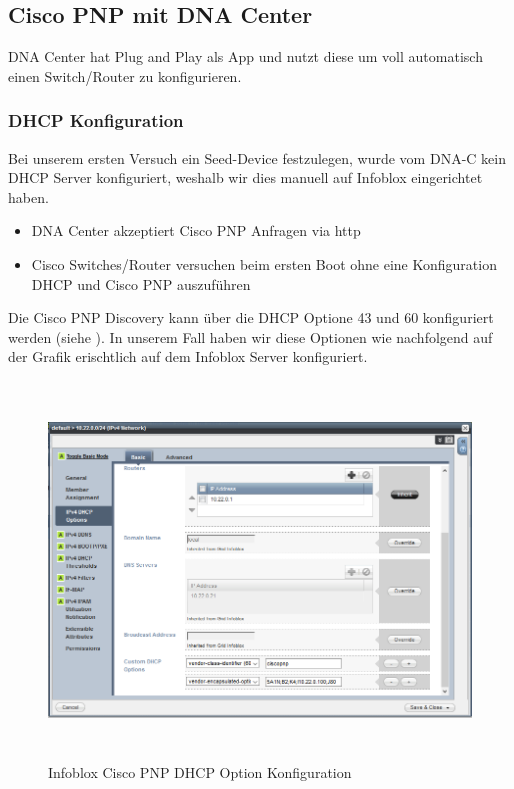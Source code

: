 \subsection{Cisco PNP mit DNA Center}
DNA Center hat Plug and Play als App und nutzt diese um voll automatisch einen Switch/Router zu konfigurieren. 
\subsubsection{DHCP Konfiguration}
Bei unserem ersten Versuch ein Seed-Device festzulegen, wurde vom DNA-C kein DHCP Server konfiguriert, weshalb wir dies manuell auf Infoblox eingerichtet haben.
 
\begin{itemize}
	\item DNA Center akzeptiert Cisco PNP Anfragen via http
	\item Cisco Switches/Router versuchen beim ersten Boot ohne eine Konfiguration DHCP und Cisco PNP auszuführen
\end{itemize}

Die Cisco PNP Discovery kann über die DHCP Optione 43 und 60 konfiguriert werden (siehe \cite{cisco-pnp-dhcp}). In unserem Fall haben wir diese Optionen wie nachfolgend auf der Grafik erischtlich auf dem Infoblox Server konfiguriert.

\begin{figure}[H]
	\centering
	\includegraphics[height=10cm]{img/Infoblox_PNP.png}
	\caption{Infoblox Cisco PNP DHCP Option Konfiguration}
	\label{fig:cisco-pnp}
\end{figure}


